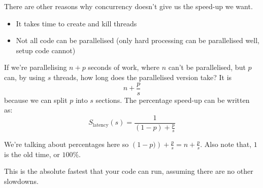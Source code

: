 There are other reasons why concurrency doesn't give us the speed-up we want.
\begin{itemize}
    \item It takes time to create and kill threads
    \item Not all code can be parallelised (only hard processing can be parallelised well, setup code cannot)
\end{itemize}
If we're parallelising \(n+p\) seconds of work, where \(n\) can't be parallelised, but \(p\) can, by using \(s\) threads, how long does the parallelised version take?
It is
\[
    n + \frac{p}{s}
\]
because we can split \(p\) into \(s\) sections.
The percentage speed-up can be written as:
\[
    S_{\text{latency}}(s) = \frac{1}{\left( 1-p \right) + \frac{p}{s}}
\]
\begin{note}
    We're talking about percentages here so \(\left( 1-p) \right) + \frac{p}{s} = n + \frac{p}{s}\).
    Also note that, \(1\) is the old time, or \(100\%\).
\end{note}
This is the absolute fastest that your code can run, assuming there are no other slowdowns.
